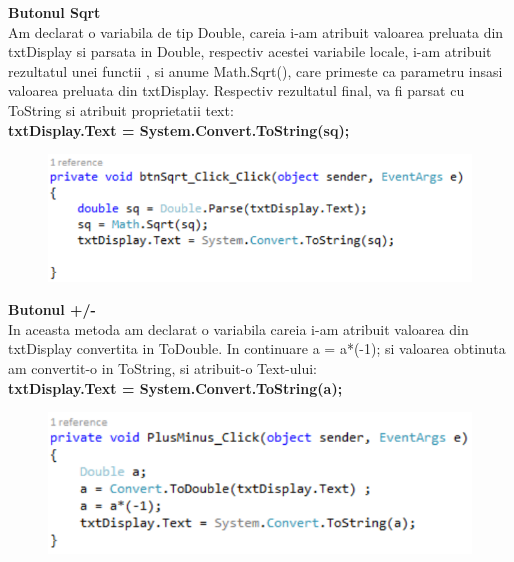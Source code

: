 \textbf{Butonul Sqrt} \\
Am declarat o variabila de tip Double, careia i-am atribuit valoarea preluata din txtDisplay si parsata in Double, respectiv acestei variabile locale, i-am atribuit rezultatul unei functii  , si anume Math.Sqrt(), care primeste ca parametru insasi valoarea preluata din txtDisplay. Respectiv rezultatul final, va fi parsat cu ToString si atribuit proprietatii text: \\
\textbf{txtDisplay.Text = System.Convert.ToString(sq);} \\

\begin{figure}[h]
\centering
\includegraphics[scale=1]{5.pdf}
\end{figure}

\textbf{ Butonul +/- } \\
In aceasta metoda am declarat o variabila careia i-am atribuit valoarea din txtDisplay convertita in ToDouble. In continuare  a = a*(-1); si valoarea obtinuta am convertit-o in ToString, si atribuit-o Text-ului: \\
\textbf{txtDisplay.Text = System.Convert.ToString(a);}
\begin{figure}[h]
\centering
\includegraphics[scale=1]{6.pdf}
\end{figure}
\clearpage
